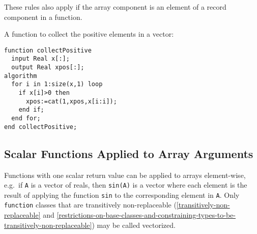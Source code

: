These rules also apply if the array component is an element of a record
component in a function.

\begin{example}
A function to collect the positive elements in a vector:
\begin{lstlisting}[language=modelica]
function collectPositive
  input Real x[:];
  output Real xpos[:];
algorithm
  for i in 1:size(x,1) loop
    if x[i]>0 then
      xpos:=cat(1,xpos,x[i:i]);
    end if;
  end for;
end collectPositive;
\end{lstlisting}
\end{example}

\subsection{Scalar Functions Applied to Array Arguments}\label{scalar-functions-applied-to-array-arguments}

Functions with one scalar return value can be applied to arrays element-wise, e.g.\ if \lstinline!A! is a vector of reals, then \lstinline!sin(A)! is a vector where each element is the result of applying the function \lstinline!sin! to the corresponding element in \lstinline!A!.  Only \lstinline!function! classes that are transitively non-replaceable (\cref{transitively-non-replaceable} and \cref{restrictions-on-base-classes-and-constraining-types-to-be-transitively-non-replaceable}) may be called vectorized.

